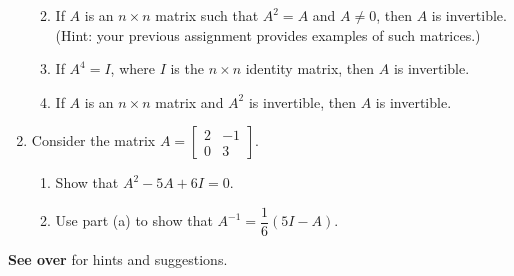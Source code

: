 \documentclass[letterpaper,12pt]{amsart}
\newcommand{\bbm}{\begin{bmatrix}}
\newcommand{\ebm}{\end{bmatrix}}
\begin{document}
\begin{enumerate}
\begin{enumerate}
\medskip

 \item If $A$ is an $n\times n$ matrix such that $A^2=A$ and $A\neq 0$, then $A$ is invertible. (Hint: your previous assignment provides examples of such matrices.)

\medskip

 \item If $A^4=I$, where $I$ is the $n\times n$ identity matrix, then $A$ is invertible.

\medskip

 \item If $A$ is an $n\times n$ matrix and $A^2$ is invertible, then $A$ is invertible.
\end{enumerate}

\bigskip

\bigskip

\item Consider the matrix $A = \bbm 2&-1\\0&3\ebm$.

\medskip

\begin{enumerate}
 \item Show that $A^2-5A+6I=0$.

\medskip

 \item Use part (a) to show that $A^{-1} = \dfrac{1}{6}(5I-A)$.
\end{enumerate}
\end{enumerate}

\bigskip

{\bf See over} for hints and suggestions.

\newpage
\end{document}
